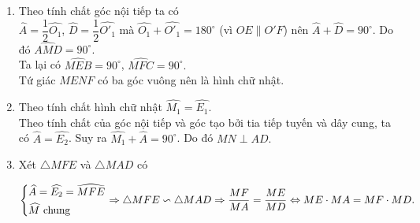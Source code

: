 \begin{bt}
{\begin{center}
		\end{center}
		\begin{enumerate}
			\item Theo tính chất góc nội tiếp ta có\\
			$\widehat{A}=\dfrac{1}{2}\widehat{O_1}$, $\widehat{D}=\dfrac{1}{2}\widehat{O'_1}$ mà $\widehat{O_1}+\widehat{O'_1}=180^\circ $ (vì $OE\parallel O'F$) nên $\widehat{A}+\widehat{D}=90^\circ$. Do đó $\widehat{AMD}=90^\circ.$\\
			Ta lại có $\widehat{MEB}=90^\circ$, $\widehat{MFC}=90^\circ.$\\
			Tứ giác $MENF$ có ba góc vuông nên là hình chữ nhật.
			\item Theo tính chất hình chữ nhật $\widehat{M_1}=\widehat{E_1}.$\\
			Theo tính chất của góc nội tiếp và góc tạo bởi tia tiếp tuyến và dây cung, ta có $\widehat{A}=\widehat{E_2}$. Suy ra $\widehat{M_1}+\widehat{A}=90^\circ$. Do đó $MN\perp AD.$
			\item Xét $\triangle MFE$ và $\triangle MAD$ có
			\begin{center}
				$\left\{\begin{aligned}&\widehat{A}=\widehat{E_2}=\widehat{MFE}\\&\widehat{M} \text{ chung}\end{aligned}\right.\Rightarrow \triangle MFE\backsim \triangle MAD\Rightarrow \dfrac{MF}{MA}=\dfrac{ME}{MD}\Leftrightarrow ME\cdot MA=MF\cdot MD.$
			\end{center}
		\end{enumerate}
	}
\end{bt}

